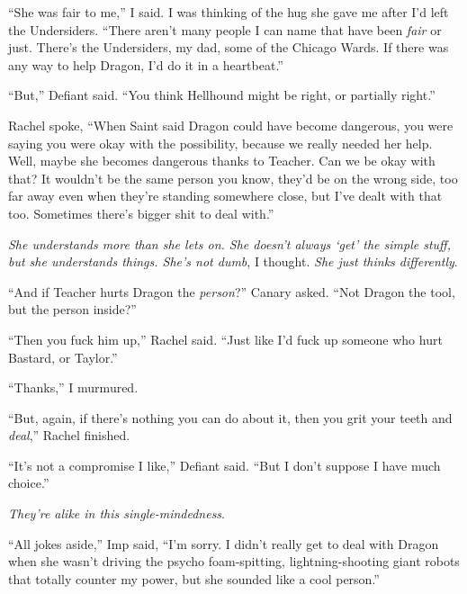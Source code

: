 ``She was fair to me,'' I said.  I was thinking of the hug she gave me after I'd left the Undersiders.  ``There aren't many people I can name that have been \emph{fair} or just.  There's the Undersiders, my dad, some of the Chicago Wards.  If there was any way to help Dragon, I'd do it in a heartbeat.''



``But,'' Defiant said.  ``You think Hellhound might be right, or partially right.''



Rachel spoke, ``When Saint said Dragon could have become dangerous, you were saying you were okay with the possibility, because we really needed her help.  Well, maybe she becomes dangerous thanks to Teacher.  Can we be okay with that?  It wouldn't be the same person you know, they'd be on the wrong side, too far away even when they're standing somewhere close, but I've dealt with that too.  Sometimes there's bigger shit to deal with.''



\emph{She understands more than she lets on.  She doesn't always `get' the simple stuff, but she understands things.  She's not dumb}, I thought.  \emph{She just thinks differently}.



``And if Teacher hurts Dragon the \emph{person}?''  Canary asked.  ``Not Dragon the tool, but the person inside?''



``Then you fuck him up,'' Rachel said.  ``Just like I'd fuck up someone who hurt Bastard, or Taylor.''



``Thanks,'' I murmured.



``But, again, if there's nothing you can do about it, then you grit your teeth and \emph{deal},'' Rachel finished.



``It's not a compromise I like,'' Defiant said.  ``But I don't suppose I have much choice.''



\emph{They're alike in this single-mindedness}.



``All jokes aside,'' Imp said, ``I'm sorry.  I didn't really get to deal with Dragon when she wasn't driving the psycho foam-spitting, lightning-shooting giant robots that totally counter my power, but she sounded like a cool person.''



